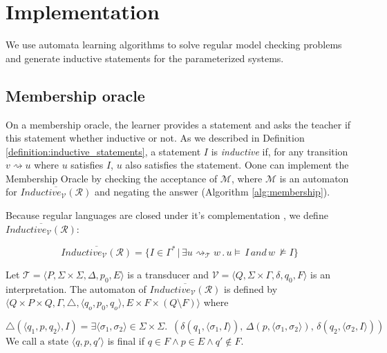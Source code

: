 \chapter{Implementation}\label{chapter:implementation}

We use automata learning algorithms to solve regular 
model checking problems and generate inductive statements for the parameterized systems.

\section{Membership oracle}
On a membership oracle, the learner provides a statement and asks the teacher if 
this statement whether inductive or not. As we described in Definition \ref{definition:inductive_statements}, 
a statement $I$ is \textit{inductive} if, for any transition $v \rightsquigarrow u$
where $u$ satisfies $I$, $u$ also satisfies the statement.
Oone can implement the Membership Oracle by checking the acceptance 
of $\mathcal{M}$, where $\mathcal{M}$ is an automaton for 
$\overline{Inductive_{\mathcal{V}}(\mathcal{R})}$ and negating the answer (Algorithm \ref{alg:membership}).

Because regular languages are closed under it's complementation \cite{holzer2015closure}, we define $\overline{Inductive_{\mathcal{V}}(\mathcal{R})}$:

\begin{equation}\label{eq:non_inductive}
\overline{Inductive_{\mathcal{V}}(\mathcal{R})} = \lbrace I \in \Gamma^* \, | \, \exists u
\rightsquigarrow_\mathcal{T} w \, . \, u \models \, I \, and \, w \, \not\models I\rbrace
\end{equation}

Let $\mathcal{T} =  \langle P, \Sigma \times \Sigma, \Delta, p_0, E \rangle$ 
is a transducer and  $\mathcal{V} =  \langle Q, \Sigma \times \Gamma, \delta, q_0, F \rangle$ is 
an interpretation. The automaton of $\overline{Inductive_{\mathcal{V}}(\mathcal{R})}$ 
is defined by $\langle Q \times P \times Q, \Gamma, \triangle, \langle q_o,  p_0, q_o \rangle, 
E \times F \times (Q \setminus F) \rangle$ where

\begin{equation*}
    \triangle(\langle q_1, p, q_2 \rangle, I) =  \exists \langle \sigma_1, \sigma_2 \rangle \in \Sigma \times \Sigma. \,\,\,
    (\delta(q_1, \langle \sigma_1, I \rangle) ,\, \Delta(p, \langle \sigma_1, \sigma_2 \rangle) ,\, \delta(q_2, \langle \sigma_2, I \rangle))
\end{equation*}
We call a state $\langle q, p, q' \rangle$ is final if $q \in  F \wedge p \in E \wedge q' \notin  F$.

